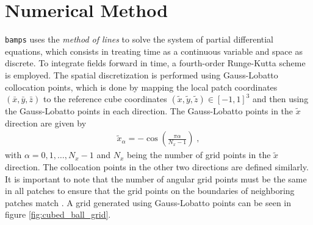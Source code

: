 \section{Numerical Method}
\label{section:Numerical_Method}

\texttt{bamps} uses the \textit{method of lines} to solve the system of partial differential equations, which consists in treating time as a continuous variable and space as discrete. To integrate fields forward in time, a fourth-order Runge-Kutta scheme is employed. The spatial discretization is performed using Gauss-Lobatto collocation points, which is done by mapping the local patch coordinates $(\bar{x},\bar{y},\bar{z})$ to the reference cube coordinates $(\tilde{x},\tilde{y},\tilde{z}) \in [-1,1]^3$ and then using the Gauss-Lobatto points in each direction. The Gauss-Lobatto points in the $\tilde{x}$ direction are given by
%
\begin{align}
    \tilde{x}_\alpha = - \cos\left(\frac{\pi \alpha}{N_x -1}\right) \; ,
\end{align}
%
with $\alpha = 0,1,\ldots,N_x -1$ and $N_x$ being the number of grid points in the $\tilde{x}$ direction. The collocation points in the other two directions are defined similarly. It is important to note that the number of angular grid points must be the same in all patches to ensure that the grid points on the boundaries of neighboring patches match \cite{Pseudospectral_method_for_gravitational_wave_collapse}. A grid generated using Gauss-Lobatto points can be seen in figure \ref{fig:cubed_ball_grid}.

